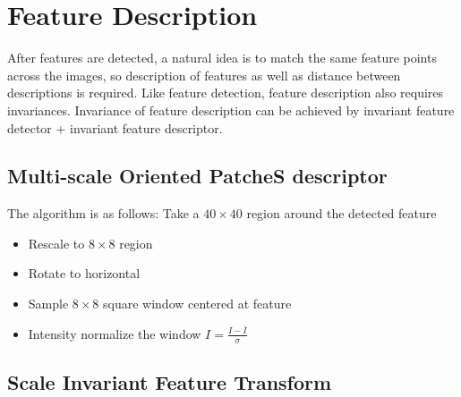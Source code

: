 \documentclass[runningheads]{llncs}
\begin{document}
\section{Feature Description}
After features are detected, a natural idea is to match the same
feature points across the images, so description of features
as well as distance between descriptions is required.
Like feature detection, feature description also requires
invariances. Invariance of feature description can be achieved
by invariant feature detector + invariant feature descriptor.
\subsection{Multi-scale Oriented PatcheS descriptor}
The algorithm is as follows:
Take a $40 \times 40$ region around the detected feature
\begin{itemize}
    \item Rescale to $8 \times 8$ region
    \item Rotate to horizontal
    \item Sample $8 \times 8$ square window centered at feature
    \item Intensity normalize the window $I = \frac{I - \bar{I}}{\sigma}$
\end{itemize}

\subsection{Scale Invariant Feature Transform}
\end{document}
